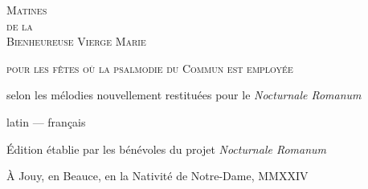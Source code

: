 \documentclass[nocturnal_bvm_fr.tex]{subfiles}
\begin{document}
\null

\vfill
\begin{center}
{\Huge \textsc{Matines\\\vspace{2mm}de la\\\vspace{5mm}Bienheureuse Vierge Marie}}\par
\vspace{3cm}
{\large \textsc{pour les fêtes où la psalmodie du Commun est employée}}\par
\vspace{4.5cm}
{\large selon les mélodies nouvellement restituées pour le \emph{Nocturnale Romanum}}\par
\vspace{2.5cm}
{\large latin --- français}\par
\end{center}
\vfill

\begin{center}
{\footnotesize Édition établie par les bénévoles du projet \emph{Nocturnale Romanum}}

{\footnotesize À Jouy, en Beauce, en la Nativité de Notre-Dame, MMXXIV}
\end{center}
\end{document}

